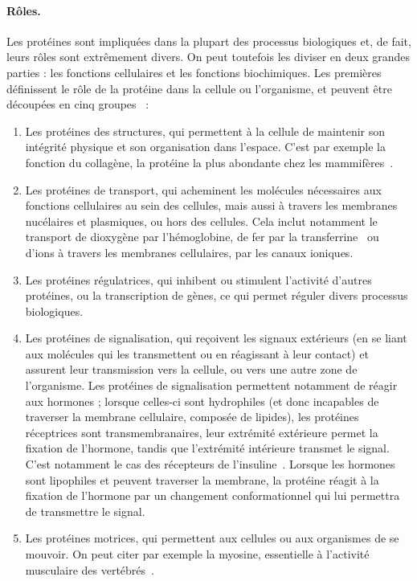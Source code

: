	\paragraph{Rôles.}
	Les protéines sont impliquées dans la plupart des processus biologiques et, de fait, leurs rôles sont extrêmement divers. On peut toutefois les diviser en deux grandes parties : les fonctions cellulaires et les fonctions biochimiques. Les premières définissent le rôle de la protéine dans la cellule ou l'organisme, et peuvent être découpées en cinq groupes~\cite{lodish1995molecular} :
	\begin{enumerate}
		\item Les protéines des structures, qui permettent à la cellule de maintenir son intégrité physique et son organisation dans l'espace. C'est par exemple la fonction du collagène, la protéine la plus abondante chez les mammifères~\cite{di2002mapping}.%
		\item Les protéines de transport, qui acheminent les molécules nécessaires aux fonctions cellulaires au sein des cellules, mais aussi à travers les membranes nucélaires et plasmiques, ou hors des cellules. Cela inclut notamment le transport de dioxygène par l'hémoglobine, de fer par la transferrine~\cite{crichton1987iron} ou d'ions à travers les membranes cellulaires, par les canaux ioniques. %
		\item Les protéines régulatrices, qui inhibent ou stimulent l'activité d'autres protéines, ou la transcription de gènes, ce qui permet réguler divers processus biologiques.%
		\item Les protéines de signalisation, qui reçoivent les signaux extérieurs (en se liant aux molécules qui les transmettent ou en réagissant à leur contact) et assurent leur transmission vers la cellule, ou vers une autre zone de l'organisme. Les protéines de signalisation permettent notamment de réagir aux hormones ; lorsque celles-ci sont hydrophiles (et donc incapables de traverser la membrane cellulaire, composée de lipides), les protéines réceptrices sont transmembranaires, leur extrémité extérieure permet la fixation de l'hormone, tandis que l'extrémité intérieure transmet le signal. C'est notamment le cas des récepteurs de l'insuline~\cite{gammeltoft1984insulin}. Lorsque les hormones sont lipophiles et peuvent traverser la membrane, la protéine réagit à la fixation de l'hormone par un changement conformationnel qui lui permettra de transmettre le signal. %
		\item Les protéines motrices, qui permettent aux cellules ou aux organismes de se mouvoir. On peut citer par exemple la myosine, essentielle à l'activité musculaire des vertébrés~\cite{pollard1973acanthamoeba}.%
	\end{enumerate}	


